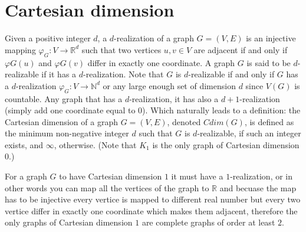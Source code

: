 \documentclass[12pt,a4paper,titlepage,openany]{report}
\begin{document}
\chapter{Cartesian dimension}
Given a positive integer $d$, a $d$-realization of a graph $G=(V,E)$ is an injective mapping $\varphi_G:V\rightarrow \mathbb{R}^d$ such that two vertices $u, v \in V$ are adjacent if and only if $\varphi G(u)$ and $\varphi G(v)$ differ in exactly one coordinate. A graph $G$ is said to be $d$-realizable if it has a $d$-realization. Note that $G$ is $d$-realizable if and only if $G$ has a $d$-realization $\varphi_G : V \rightarrow \mathbb{N}^d$ or any large enough set of dimension $d$ since $V(G)$ is countable.\newline
Any graph that has a $d$-realization, it has also a $d+1$-realization (simply add one coordinate equal to $0$). Which naturally leads to a definition: the Cartesian dimension of a graph $G = (V, E)$, denoted $Cdim(G)$, is defined as the minimum non-negative integer $d$ such that $G$ is $d$-realizable, if such an integer exists, and $\infty$, otherwise. (Note that $K_1$ is the only graph of Cartesian dimension 0.)\newline

For a graph $G$ to have Cartesian dimension $1$ it must have a $1$-realization, or in other words you can map all the vertices of the graph to $\mathbb{R}$ and becuase the map has to be injective every vertice is mapped to different real number but every two vertice differ in exactly one coordinate which makes them adjacent, therefore the only graphs of Cartesian dimension $1$ are complete graphs of order at least $2$.
\end{document}
